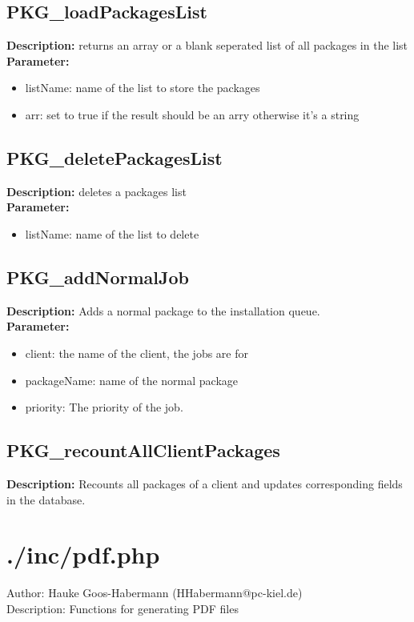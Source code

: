 \subsection{PKG\_loadPackagesList}
\textbf{Description:} returns an array or a blank seperated list of all packages in the list\\
\textbf{Parameter:}
\begin{itemize}
\item listName: name of the list to store the packages 
\item arr: set to true if the result should be an arry otherwise it's a string
\end{itemize}

\subsection{PKG\_deletePackagesList}
\textbf{Description:} deletes a packages list\\
\textbf{Parameter:}
\begin{itemize}
\item listName: name of the list to delete
\end{itemize}

\subsection{PKG\_addNormalJob}
\textbf{Description:} Adds a normal package to the installation queue.\\
\textbf{Parameter:}
\begin{itemize}
\item client: the name of the client, the jobs are for
\item packageName: name of the normal package
\item priority: The priority of the job.
\end{itemize}

\subsection{PKG\_recountAllClientPackages}
\textbf{Description:} Recounts all packages of a client and updates corresponding fields in the database.\\

\newpage\section{./inc/pdf.php}
 Author: Hauke Goos-Habermann (HHabermann@pc-kiel.de)\\
 Description: Functions for generating PDF files\\

